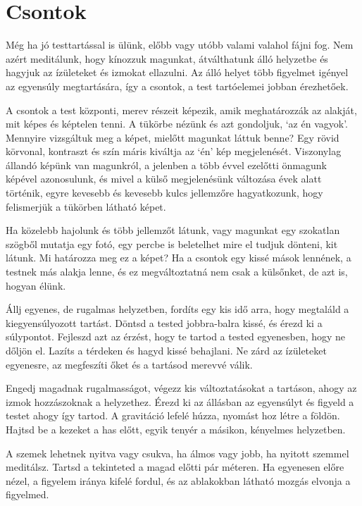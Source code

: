 \chapter{Csontok}

Még ha jó testtartással is ülünk, előbb vagy utóbb valami valahol fájni
fog. Nem azért meditálunk, hogy kínozzuk magunkat, átválthatunk álló
helyzetbe és hagyjuk az ízületeket és izmokat ellazulni. Az álló helyet
több figyelmet igényel az egyensúly megtartására, így a csontok, a test
tartóelemei jobban érezhetőek.

A csontok a test központi, merev részeit képezik, amik meghatározzák az
alakját, mit képes és képtelen tenni. A tükörbe nézünk és azt gondoljuk,
`az én vagyok'. Mennyire vizsgáltuk meg a képet, mielőtt magunkat láttuk
benne? Egy rövid körvonal, kontraszt és szín máris kiváltja az `én' kép
megjelenését. Viszonylag állandó képünk van magunkról, a jelenben a több
évvel ezelőtti önmagunk képével azonosulunk, és mivel a külső
megjelenésünk változása évek alatt történik, egyre kevesebb és kevesebb
kulcs jellemzőre hagyatkozunk, hogy felismerjük a tükörben látható
képet.

Ha közelebb hajolunk és több jellemzőt látunk, vagy magunkat egy
szokatlan szögből mutatja egy fotó, egy percbe is beletelhet mire el
tudjuk dönteni, kit látunk. Mi határozza meg ez a képet? Ha a csontok
egy kissé mások lennének, a testnek más alakja lenne, és ez
megváltoztatná nem csak a külsőnket, de azt is, hogyan élünk.

Állj egyenes, de rugalmas helyzetben, fordíts egy kis idő arra, hogy
megtaláld a kiegyensúlyozott tartást. Döntsd a tested jobbra-balra
kissé, és érezd ki a súlypontot. Fejleszd azt az érzést, hogy te tartod
a tested egyenesben, hogy ne dőljön el. Lazíts a térdeken és hagyd kissé
behajlani. Ne zárd az ízületeket egyenesre, az megfeszíti őket és a
tartásod merevvé válik.

Engedj magadnak rugalmasságot, végezz kis változtatásokat a tartáson,
ahogy az izmok hozzászoknak a helyzethez. Érezd ki az állásban az
egyensúlyt és figyeld a testet ahogy így tartod. A gravitáció lefelé
húzza, nyomást hoz létre a földön. Hajtsd be a kezeket a has előtt,
egyik tenyér a másikon, kényelmes helyzetben.

A szemek lehetnek nyitva vagy csukva, ha álmos vagy jobb, ha nyitott
szemmel meditálsz. Tartsd a tekinteted a magad előtti pár méteren. Ha
egyenesen előre nézel, a figyelem iránya kifelé fordul, és az ablakokban
látható mozgás elvonja a figyelmed.

